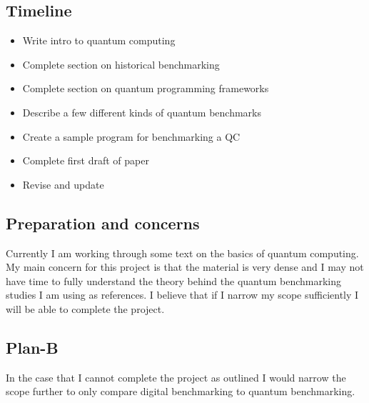 \documentclass{article}
\begin{document}
\subsection{Timeline}
\begin{itemize}
    \item Write intro to quantum computing
    \item Complete section on historical benchmarking
    \item Complete section on quantum programming frameworks
    \item Describe a few different kinds of quantum benchmarks
    \item Create a sample program for benchmarking a QC
    \item Complete first draft of paper
    \item Revise and update
\end{itemize}
\subsection{Preparation and concerns}
Currently I am working through some text on the basics of quantum computing. My main concern for this project is that the material is very dense and I may not have time to fully understand the theory behind the quantum benchmarking studies I am using as references. I believe that if I narrow my scope sufficiently I will be able to complete the project.
\subsection{Plan-B}
In the case that I cannot complete the project as outlined I would narrow the scope further to only compare digital benchmarking to quantum benchmarking.
\end{document}
